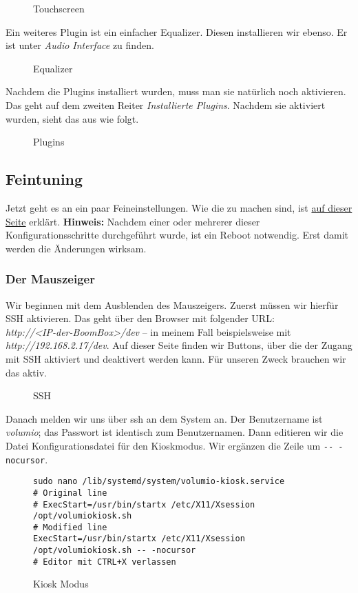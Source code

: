 \documentclass[12pt,a4paper]{article}
\newcommand{\code}[1]{\texttt{#1}}
\newcommand{\jpaimg}[2]{\begin{figure}[H]\centering\fbox{\texttt{[image: \#1]}}\caption{#2}\label{fig:#2}\end{figure}}
\begin{document}
\jpaimg{./../images/vol-touch.png}{Touchscreen}

Ein weiteres Plugin ist ein einfacher Equalizer. Diesen installieren wir ebenso. Er ist unter \textit{Audio Interface} zu finden.

\jpaimg{./../images/vol-equal.png}{Equalizer}

Nachdem die Plugins installiert wurden, muss man sie natürlich noch aktivieren. Das geht auf dem zweiten Reiter \textit{Installierte Plugins}. Nachdem sie
aktiviert wurden, sieht das aus wie folgt.

\jpaimg{./../images/vol-plug-active.png}{Plugins}

\subsection{Feintuning}\label{subsec:Feintuning}
Jetzt geht es an ein paar Feineinstellungen. Wie die zu machen sind, ist \href{https://volumio.org/forum/guide-for-setting-touchscreen-backlight-control-t11425.html}{auf dieser Seite}
erklärt. \textbf{Hinweis:} Nachdem einer oder mehrerer dieser Konfigurationsschritte durchgeführt wurde, ist ein Reboot notwendig. Erst damit werden die
Änderungen wirksam.

\subsubsection{Der Mauszeiger}\label{subsubsec:SSH}
Wir beginnen mit dem Ausblenden des Mauszeigers. Zuerst müssen wir hierfür SSH aktivieren. Das geht über den Browser mit folgender URL:\@ \\
\textit{http://<IP-der-BoomBox>/dev} -- in meinem Fall beispielsweise mit \\ \textit{http://192.168.2.17/dev}. Auf dieser Seite finden wir Buttons, über die der
Zugang mit SSH aktiviert und deaktivert werden kann. Für unseren Zweck brauchen wir das aktiv.

\jpaimg{./../images/vol-dev.png}{SSH}

Danach melden wir uns über ssh an dem System an. Der Benutzername ist \textit{volumio}; das Passwort ist identisch zum Benutzernamen. Dann editieren wir die
Datei Konfigurationsdatei für den Kioskmodus. Wir ergänzen die Zeile um \code{-{}- -nocursor}.

\begin{figure}[H]
\begin{lstlisting}
sudo nano /lib/systemd/system/volumio-kiosk.service
# Original line
# ExecStart=/usr/bin/startx /etc/X11/Xsession /opt/volumiokiosk.sh
# Modified line
ExecStart=/usr/bin/startx /etc/X11/Xsession /opt/volumiokiosk.sh -- -nocursor
# Editor mit CTRL+X verlassen
\end{lstlisting}
\caption{Kiosk Modus}\label{fig:Kiosk Modus}
\end{figure}
\end{document}
